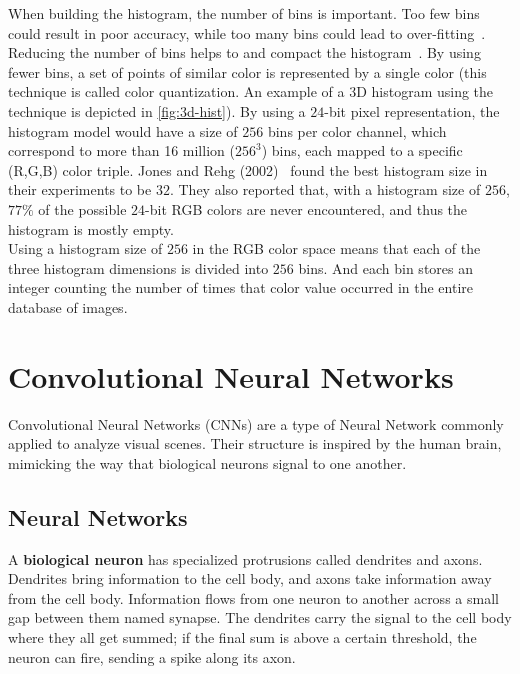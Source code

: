 
When building the histogram, the number of bins is important. Too few bins could result in poor accuracy, while too many bins could lead to over-fitting~\cite{jones2002statistical}.
Reducing the number of bins helps to  and compact the histogram~\cite{gomez2002selecting}.
By using fewer bins, a set of points of similar color is represented by a single color (this technique is called color quantization. An example of a 3D histogram using the technique is depicted in \autoref{fig:3d-hist}).
By using a $24$-bit pixel representation, the histogram model would have a size of $256$ bins per color channel, which correspond to more than 16 million ($256^3$) bins, each mapped to a specific (R,G,B) color triple.
Jones and Rehg (2002)~\cite{jones2002statistical} found the best histogram size in their experiments to be $32$.
They also reported that, with a histogram size of $256$, $77\%$ of the possible $24$-bit RGB colors are never encountered, and thus the histogram is mostly empty.\\
Using a histogram size of $256$ in the RGB color space means that each of the three histogram dimensions is divided into $256$ bins. And each bin stores an integer counting the number of times that color value occurred in the entire database of images.


\FloatBarrier
\section{Convolutional Neural Networks}

Convolutional Neural Networks (CNNs) are a type of Neural Network commonly applied to analyze visual scenes. Their structure is inspired by the human brain, mimicking the way that biological neurons signal to one another.


\FloatBarrier
\subsection{Neural Networks}

A \textbf{biological neuron} has specialized protrusions called dendrites and axons.
Dendrites bring information to the cell body, and axons take information away from the cell body.
Information flows from one neuron to another across a small gap between them named synapse.
The dendrites carry the signal to the cell body where they all get summed; if the final sum is above a certain threshold, the neuron can fire, sending a spike along its axon.


